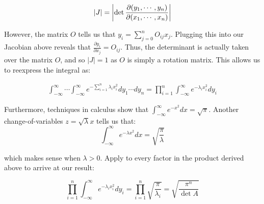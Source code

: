 \documentclass[12pt]{article}%
\begin{document}
\[ \abs{J} = \abs{\det \frac{\partial(y_1, \cdots, y_n)}{\partial(x_1,\cdots,x_n)}} \]

However, the matrix $O$ tells us that $y_i = \sum_{j = 0}^n O_{ij}x_j$. Plugging this into our Jacobian above reveals that $\frac{\partial y_i}{\partial x_j} = O_{ij}$. Thus, the determinant is actually taken over the matrix $O$, and so $|J| =1$ as $O$ is simply a rotation matrix. This allows us to reexpress the integral as:

\begin{align*}
  \int_{-\infty}^\infty \cdots \int_{-\infty}^\infty e^{-\sum_{i = 1}^n \lambda_i x_i^2} dy_1 \cdots dy_n =\prod_{i =1}^n \int_{-\infty}^\infty e^{-\lambda_i x_i^2} dy_i
\end{align*}

Furthermore, techniques in calculus show that $\int_{-\infty}^\infty e^{-x^2} dx = \sqrt{\pi}$. Another change-of-variables $z = \sqrt{\lambda} x$ tells us that:
$$\int_{-\infty}^\infty  e^{-\lambda x^2} dx = \sqrt{\frac{\pi}{\lambda}} $$

which makes sense when $\lambda > 0$. Apply to every factor in the product derived above to arrive at our result:

\[\prod_{i =1}^n \int_{-\infty}^\infty e^{-\lambda_i x_i^2} dy_i = \prod_{i =1}^n \sqrt{\frac{\pi}{\lambda_i}} = \sqrt{\frac{\pi^n}{\det A}} \]
\end{document}
